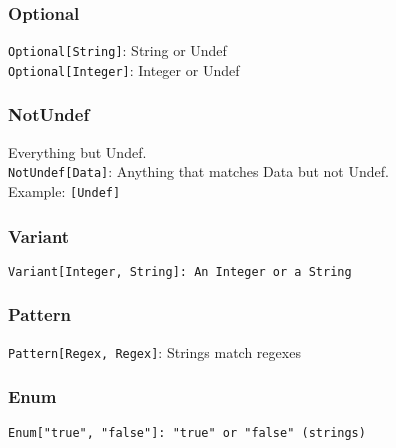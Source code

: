 \begin{frame}\frametitle{Optional}
    \begin{center}
\LARGE
\texttt{Optional[String]}: String or Undef\\
\texttt{Optional[Integer]}: Integer or Undef
    \end{center}
\end{frame}
\begin{frame}\frametitle{NotUndef}
    \begin{center}
\LARGE
Everything but Undef.\\
\texttt{NotUndef[Data]}: Anything that matches Data but not Undef.\\
Example: \texttt{[Undef]}
    \end{center}
\end{frame}
\begin{frame}\frametitle{Variant}
    \begin{center}
\LARGE
\texttt{Variant[Integer, String]: An Integer or a String}
    \end{center}
\end{frame}
\begin{frame}\frametitle{Pattern}
    \begin{center}
\LARGE
\texttt{Pattern[Regex, Regex]}: Strings match regexes
    \end{center}
\end{frame}
\begin{frame}\frametitle{Enum}
    \begin{center}
\LARGE
\texttt{Enum["true", "false"]: "true" or "false" (strings)}
    \end{center}
\end{frame}
